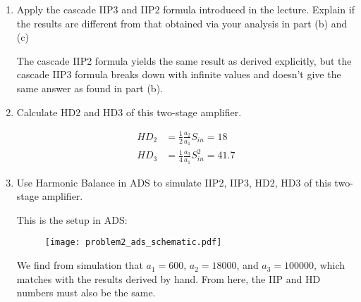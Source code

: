 \begin{enumerate}[label=(\alph*)]
    \item {\color{blue} Apply the cascade IIP3 and IIP2 formula introduced in the lecture. Explain if the results are different from that obtained via your analysis in part (b) and (c)}

    The cascade IIP2 formula yields the same result as derived explicitly, but the cascade IIP3 formula breaks down with infinite values and doesn't give the same answer as found in part (b).

    \item {\color{blue} Calculate HD2 and HD3 of this two-stage amplifier.}

    \begin{align*}
        HD_2 &= \frac{1}{2} \frac{a_2}{a_1} S_{in} = 18 \\
        HD_3 &= \frac{1}{4} \frac{a_3}{a_1} S_{in}^2 = 41.7
    \end{align*}

    \item {\color{blue} Use Harmonic Balance in ADS to simulate IIP2, IIP3, HD2, HD3 of this two-stage amplifier.}

    This is the setup in ADS:
    \begin{figure}[H]
        \centering \texttt{[image: problem2\_ads\_schematic.pdf]}
    \end{figure}

    We find from simulation that $a_1 = 600$, $a_2 = 18000$, and $a_3 = 100000$, which matches with the results derived by hand.
    From here, the IIP and HD numbers must also be the same.
\end{enumerate}

